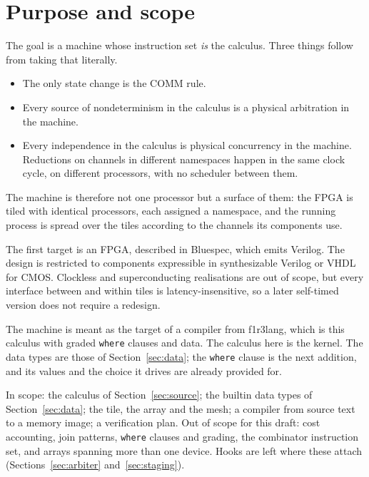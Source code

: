 \documentclass[10.5pt,a4paper]{extarticle}
\newcommand{\kw}[1]{\texttt{#1}}
\theoremstyle{definition}
\theoremstyle{remark}
\begin{document}
\tableofcontents

\section{Purpose and scope}

The goal is a machine whose instruction set \emph{is} the calculus. Three
things follow from taking that literally.
\begin{itemize}
\item The only state change is the COMM rule.
\item Every source of nondeterminism in the calculus is a physical
arbitration in the machine.
\item Every independence in the calculus is physical concurrency in the
machine. Reductions on channels in different namespaces happen in the same
clock cycle, on different processors, with no scheduler between them.
\end{itemize}
The machine is therefore not one processor but a surface of them: the FPGA is
tiled with identical processors, each assigned a namespace, and the running
process is spread over the tiles according to the channels its components
use.

The first target is an FPGA, described in Bluespec, which emits Verilog. The
design is restricted to components expressible in synthesizable Verilog or
VHDL for CMOS. Clockless and superconducting realisations are out of scope,
but every interface between and within tiles is latency-insensitive, so a
later self-timed version does not require a redesign.

The machine is meant as the target of a compiler from f1r3lang, which is
this calculus with graded \kw{where} clauses and data. The calculus here is
the kernel. The data types are those of Section~\ref{sec:data}; the
\kw{where} clause is the next addition, and its values and the choice it
drives are already provided for.

In scope: the calculus of Section~\ref{sec:source}; the builtin data types
of Section~\ref{sec:data}; the tile, the array and
the mesh; a compiler from source text to a memory image; a verification
plan. Out of scope for this draft: cost accounting, join patterns,
\kw{where} clauses and grading, the combinator instruction set, and
arrays spanning more than one device. Hooks are left where these attach
(Sections~\ref{sec:arbiter} and~\ref{sec:staging}).

\end{document}

